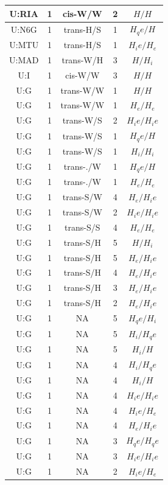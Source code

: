 \begin{center}
\begin{longtable}{c|c|c|c|c}
U:RIA & 1 & cis-W/W & 2 & $H/H$ \\  \hline
U:N6G & 1 & trans-H/S & 1 & $H_qe/H$ \\  \hline
U:MTU & 1 & trans-H/S & 1 & $H_ie/H_e$ \\  \hline
U:MAD & 1 & trans-W/H & 3 & $H/H_i$ \\  \hline
U:I & 1 & cis-W/W & 3 & $H/H$ \\  \hline
U:G & 1 & trans-W/W & 1 & $H/H$ \\  \hline
U:G & 1 & trans-W/W & 1 & $H_e/H_e$ \\  \hline
U:G & 1 & trans-W/S & 2 & $H_ie/H_ie$ \\  \hline
U:G & 1 & trans-W/S & 1 & $H_qe/H$ \\  \hline
U:G & 1 & trans-W/S & 1 & $H_i/H_i$ \\  \hline
U:G & 1 & trans-./W & 1 & $H_qe/H$ \\  \hline
U:G & 1 & trans-./W & 1 & $H_e/H_e$ \\  \hline
U:G & 1 & trans-S/W & 4 & $H_e/H_ie$ \\  \hline
U:G & 1 & trans-S/W & 2 & $H_ie/H_ie$ \\  \hline
U:G & 1 & trans-S/S & 4 & $H_e/H_e$ \\  \hline
U:G & 1 & trans-S/H & 5 & $H/H_i$ \\  \hline
U:G & 1 & trans-S/H & 5 & $H_e/H_ie$ \\  \hline
U:G & 1 & trans-S/H & 4 & $H_e/H_ie$ \\  \hline
U:G & 1 & trans-S/H & 3 & $H_e/H_ie$ \\  \hline
U:G & 1 & trans-S/H & 2 & $H_e/H_ie$ \\  \hline
U:G & 1 & NA & 5 & $H_qe/H_i$ \\  \hline
U:G & 1 & NA & 5 & $H_i/H_qe$ \\  \hline
U:G & 1 & NA & 5 & $H_i/H$ \\  \hline
U:G & 1 & NA & 4 & $H_i/H_qe$ \\  \hline
U:G & 1 & NA & 4 & $H_i/H$ \\  \hline
U:G & 1 & NA & 4 & $H_ie/H_ie$ \\  \hline
U:G & 1 & NA & 4 & $H_ie/H_e$ \\  \hline
U:G & 1 & NA & 4 & $H_e/H_ie$ \\  \hline
U:G & 1 & NA & 3 & $H_qe/H_qe$ \\  \hline
U:G & 1 & NA & 3 & $H_ie/H_ie$ \\  \hline
U:G & 1 & NA & 2 & $H_ie/H_e$ \\  \hline

\end{longtable}
\end{center}
